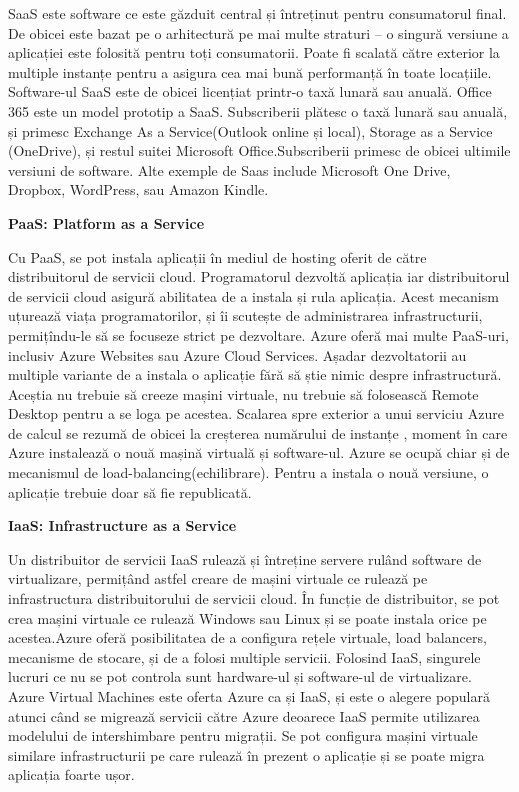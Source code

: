 SaaS este software ce este găzduit central și întreținut pentru consumatorul final. De obicei este bazat pe o arhitectură pe mai multe straturi – o singură versiune a aplicației este folosită pentru toți consumatorii. Poate fi scalată către exterior la multiple instanțe pentru a asigura cea mai bună performanță în toate locațiile. Software-ul SaaS este de obicei licențiat printr-o taxă lunară sau anuală.
Office 365 este un model prototip a SaaS. Subscriberii plătesc o taxă lunară sau anuală, și primesc Exchange As a Service(Outlook online și local), Storage as a Service (OneDrive), și restul suitei Microsoft Office.Subscriberii primesc de obicei ultimile versiuni de software.
Alte exemple de Saas include Microsoft One Drive, Dropbox, WordPress, sau Amazon Kindle.

\textbf{PaaS: Platform as a Service}

Cu PaaS, se pot instala aplicații în mediul de hosting oferit de către distribuitorul de servicii cloud. Programatorul dezvoltă aplicația iar distribuitorul de servicii cloud asigură abilitatea de a instala și rula aplicația. Acest mecanism uțurează viața programatorilor, și îi scutește de administrarea infrastructurii, permițîndu-le să se focuseze strict pe dezvoltare.
Azure oferă mai multe PaaS-uri, inclusiv Azure Websites sau Azure Cloud Services. Așadar dezvoltatorii au multiple variante de a instala o aplicație fără să știe nimic despre infrastructură. Aceștia nu trebuie să creeze mașini virtuale, nu trebuie să folosească Remote Desktop pentru a se loga pe acestea. 
Scalarea spre exterior a unui serviciu Azure de calcul se rezumă de obicei la creșterea numărului de instanțe , moment în care Azure instalează o nouă mașină virtuală și software-ul. Azure se ocupă chiar și de mecanismul de load-balancing(echilibrare). Pentru a instala o nouă versiune, o aplicație trebuie doar să fie republicată.

\textbf{IaaS: Infrastructure as a Service}

Un distribuitor de servicii IaaS rulează și întreține servere rulând software de virtualizare, permițând astfel creare de mașini virtuale ce rulează pe infrastructura distribuitorului de servicii cloud. În funcție de distribuitor, se pot crea mașini virtuale ce rulează Windows sau Linux și se poate instala orice pe acestea.Azure oferă posibilitatea de a configura rețele virtuale, load balancers, mecanisme de stocare, și de a folosi multiple servicii. Folosind IaaS, singurele lucruri ce nu se pot controla sunt hardware-ul și software-ul de virtualizare.
Azure Virtual Machines este oferta Azure ca și IaaS, și este o alegere populară atunci când se migrează servicii către Azure deoarece IaaS permite utilizarea modelului de intershimbare pentru migrații. Se pot configura mașini virtuale similare infrastructurii pe care rulează în prezent o aplicație și se poate migra aplicația foarte ușor.

